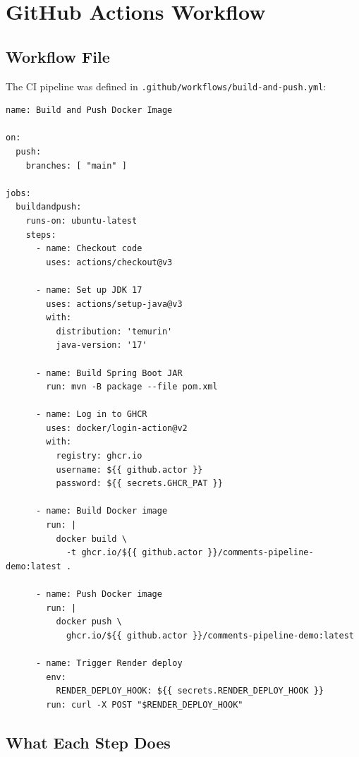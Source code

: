 \documentclass[11pt,letterpaper]{article}
\begin{document}
\section{GitHub Actions Workflow}

\subsection{Workflow File}

The CI pipeline was defined in \texttt{.github/workflows/build-and-push.yml}:

\begin{lstlisting}[caption={.github/workflows/build-and-push.yml}]
name: Build and Push Docker Image

on:
  push:
    branches: [ "main" ]

jobs:
  buildandpush:
    runs-on: ubuntu-latest
    steps:
      - name: Checkout code
        uses: actions/checkout@v3

      - name: Set up JDK 17
        uses: actions/setup-java@v3
        with:
          distribution: 'temurin'
          java-version: '17'

      - name: Build Spring Boot JAR
        run: mvn -B package --file pom.xml

      - name: Log in to GHCR
        uses: docker/login-action@v2
        with:
          registry: ghcr.io
          username: ${{ github.actor }}
          password: ${{ secrets.GHCR_PAT }}

      - name: Build Docker image
        run: |
          docker build \
            -t ghcr.io/${{ github.actor }}/comments-pipeline-demo:latest .

      - name: Push Docker image
        run: |
          docker push \
            ghcr.io/${{ github.actor }}/comments-pipeline-demo:latest

      - name: Trigger Render deploy
        env:
          RENDER_DEPLOY_HOOK: ${{ secrets.RENDER_DEPLOY_HOOK }}
        run: curl -X POST "$RENDER_DEPLOY_HOOK"
\end{lstlisting}

\subsection{What Each Step Does}
\end{document}
